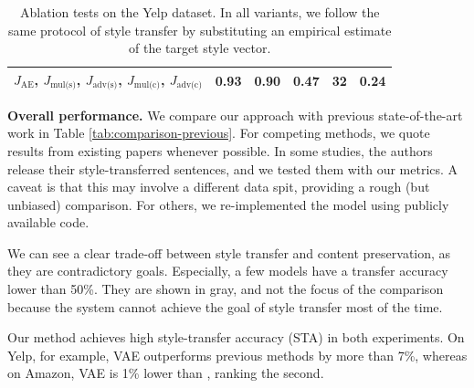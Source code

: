 \documentclass[11pt,a4paper]{article}
\newcommand{\loss}[1]{J_{\text{#1}}}
\begin{document}
\begin{table}[ht]
\begin{tabular}{| l || c | c | c | c || c |}
		$\loss{AE}$, $\loss{mul(s)}$, $\loss{adv(s)}$, $\loss{mul(c)}$, $\loss{adv(c)}$ & \textbf{0.93} & 0.90          & \textbf{0.47} & 32           & \textbf{0.24} \\ \hline
	\end{tabular}\vspace{-.2cm}
	\caption{Ablation tests on the Yelp dataset. In all variants, we follow the same protocol of style transfer by substituting an empirical estimate of the target style vector.}
	\label{tab:ablation-results}
\end{table}

\textbf{Overall performance.}
We compare our approach with previous state-of-the-art work in Table \ref{tab:comparison-previous}.
For competing methods, we quote results from existing papers whenever possible. In some studies, the authors release their style-transferred sentences, and we tested them with our metrics. A caveat is that this may involve a different data spit, providing a rough (but unbiased) comparison. For others, we re-implemented the model using publicly available code.

We can see a clear trade-off between style transfer and content preservation, as they are contradictory goals. Especially, a few models have a transfer accuracy lower than 50\%. They are shown in gray, and not the focus of the comparison because the system cannot achieve the goal of style transfer most of the time.

Our method achieves high style-transfer accuracy (STA) in both experiments. 
On Yelp, for example, VAE outperforms previous methods by more than 7\%, whereas on Amazon, VAE is 1\% lower than \citet{prabhumoye2018style}, ranking the second.
\end{document}
